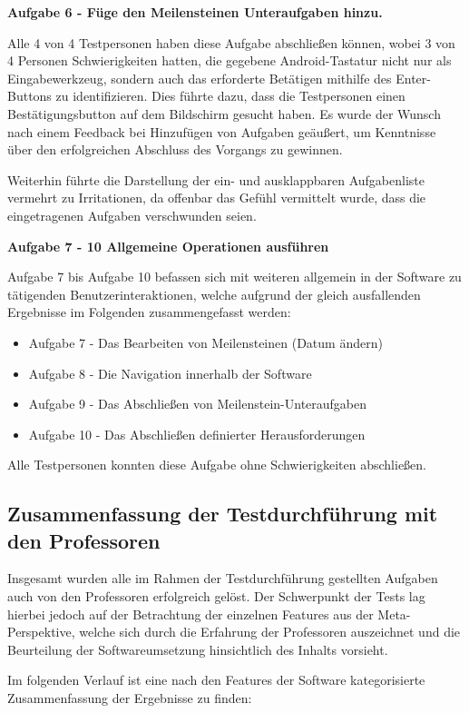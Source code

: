 \documentclass[bibliography=totoc,listof=totoc,BCOR=5mm,DIV=12,oneside]{scrbook}
\begin{document}
\newpage
\par \bigskip \textbf{Aufgabe 6 - Füge den Meilensteinen Unteraufgaben hinzu.}
\par Alle 4 von 4 Testpersonen haben diese Aufgabe abschließen können, wobei 3 von 4 Personen Schwierigkeiten hatten, die gegebene Android-Tastatur nicht nur als Eingabewerkzeug, sondern auch das erforderte Betätigen mithilfe des Enter-Buttons zu identifizieren. Dies führte dazu, dass die Testpersonen einen Bestätigungsbutton auf dem Bildschirm gesucht haben. Es wurde der Wunsch nach einem Feedback bei Hinzufügen von Aufgaben geäußert, um Kenntnisse über den erfolgreichen Abschluss des Vorgangs zu gewinnen.
\par Weiterhin führte die Darstellung der ein- und ausklappbaren Aufgabenliste vermehrt zu Irritationen, da offenbar das Gefühl vermittelt wurde, dass die eingetragenen Aufgaben verschwunden seien.

\par \bigskip \textbf{Aufgabe 7 - 10 Allgemeine Operationen ausführen}
\par Aufgabe 7 bis Aufgabe 10 befassen sich mit weiteren allgemein in der Software zu tätigenden Benutzerinteraktionen, welche aufgrund der gleich ausfallenden Ergebnisse im Folgenden zusammengefasst werden:
\begin{itemize}
\item Aufgabe 7  - Das Bearbeiten von Meilensteinen (Datum ändern)
\item Aufgabe 8  - Die Navigation innerhalb der Software
\item Aufgabe 9  - Das Abschließen von Meilenstein-Unteraufgaben
\item Aufgabe 10 - Das Abschließen definierter Herausforderungen
\end{itemize}
\par Alle Testpersonen konnten diese Aufgabe ohne Schwierigkeiten abschließen.

\newpage
\subsection{Zusammenfassung der Testdurchführung mit den Professoren}
\par Insgesamt wurden alle im Rahmen der Testdurchführung gestellten Aufgaben auch von den Professoren erfolgreich gelöst. Der Schwerpunkt der Tests lag hierbei jedoch auf der Betrachtung der einzelnen Features aus der Meta-Perspektive, welche sich durch die Erfahrung der Professoren auszeichnet und die Beurteilung der Softwareumsetzung hinsichtlich des Inhalts vorsieht.
\par \bigskip Im folgenden Verlauf ist eine nach den Features der Software kategorisierte Zusammenfassung der Ergebnisse zu finden:
\end{document}
